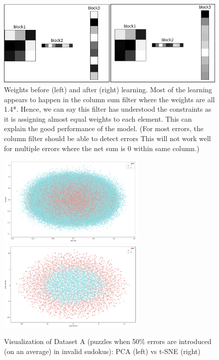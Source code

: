 \documentclass[twoside]{article}
\begin{document}
\begin{figure}
  \centering
  \includegraphics[width=\textwidth]{filters.png}
  \caption{Weights before (left) and after (right) learning. Most of the learning appears to happen in the column sum filter where the weights are all 1.4*. Hence, we can say this filter has understood the constraints as it is assigning almost equal weights to each element. This can explain the good performance of the model. (For most errors, the column filter should be able to detect errors This will not work well for multiple errors where the net sum is 0 within same column.)}
  \label{fig:filter}
\end{figure}

\begin{figure}
  \centering
  \includegraphics[width=200pt]{sudoku_pca_50error.png}
  \includegraphics[width=200pt]{sudoku_tsne_50error.png}
  \caption{Visualization of Dataset A (puzzles when 50\% errors are introduced (on an average) in invalid sudokus): PCA (left) vs t-SNE (right)}
  \label{fig:plot1}
\end{figure}
\end{document}
